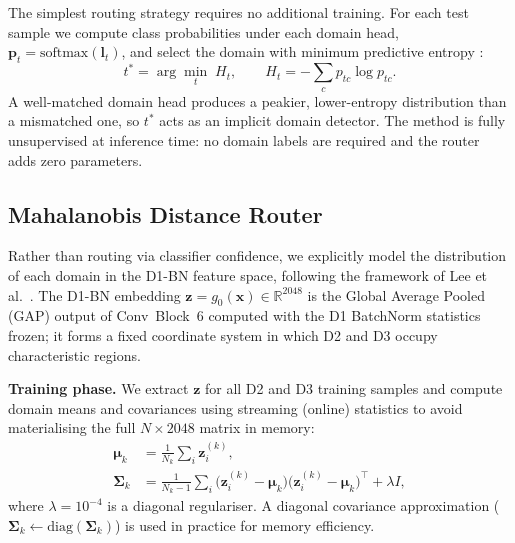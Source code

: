 \documentclass{article}
\begin{document}
\begin{sloppy}
The simplest routing strategy requires no additional training.
For each test sample we compute class probabilities under each domain head,
$\mathbf{p}_t = \text{softmax}(\mathbf{l}_t)$, and select the domain with
minimum predictive entropy \cite{mulimani2025dil}:
\begin{equation}
  \label{eqn:entropy_routing}
  t^* = \arg\min_{t}\; H_t, \qquad
  H_t = -\sum_{c} p_{tc}\log p_{tc}.
\end{equation}
A well-matched domain head produces a peakier, lower-entropy distribution
than a mismatched one, so $t^*$ acts as an implicit domain detector.
The method is fully unsupervised at inference time: no domain labels are
required and the router adds zero parameters.

\subsection{Mahalanobis Distance Router}
\label{ssec:mahal_routing}

Rather than routing via classifier confidence, we explicitly model the
distribution of each domain in the D1-BN feature space, following the
framework of Lee et al.\ \cite{lee2018mahalanobis}.  The D1-BN
embedding $\mathbf{z} = g_0(\mathbf{x}) \in \mathbb{R}^{2048}$ is the
Global Average Pooled (GAP) output of Conv~Block~6 computed with the D1
BatchNorm statistics frozen; it forms a fixed coordinate system in which D2
and D3 occupy characteristic regions.

\noindent\textbf{Training phase.}
We extract $\mathbf{z}$ for all D2 and D3 training samples and compute
domain means and covariances using streaming (online) statistics to avoid
materialising the full $N\times2048$ matrix in memory:
\begin{equation}
  \label{eqn:mahal_stats}
  \begin{aligned}
  \boldsymbol{\mu}_k &= \frac{1}{N_k}\sum_{i}\mathbf{z}_i^{(k)}, \\
  \boldsymbol{\Sigma}_k &= \frac{1}{N_k-1}\sum_i
      \bigl(\mathbf{z}_i^{(k)}-\boldsymbol{\mu}_k\bigr)
      \bigl(\mathbf{z}_i^{(k)}-\boldsymbol{\mu}_k\bigr)^\top
      + \lambda I,
  \end{aligned}
\end{equation}
where $\lambda=10^{-4}$ is a diagonal regulariser.
A diagonal covariance approximation ($\boldsymbol{\Sigma}_k \leftarrow
\mathrm{diag}(\boldsymbol{\Sigma}_k)$) is used in practice for memory
efficiency.


\end{sloppy}
\end{document}
